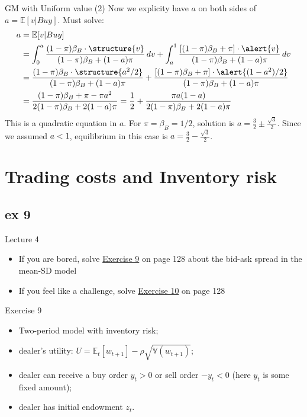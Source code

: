 \documentclass[english,10pt]{beamer}
\begin{document}
\begin{frame}{GM with Uniform value (2)}
	Now we explicity have $a$ on both sides of $a=\mathbb{E}[v|Buy]$. Must solve:
	\begin{align*}
	a 
	& = \mathbb{E}[v|Buy] \\
	& = \int^{a}_0 \frac{(1-\pi) \beta_B \cdot \structure{v}}{(1-\pi)\beta_B + (1-a) \pi} \, dv + \int^{1}_{a} \frac{[(1-\pi) \beta_B + \pi] \cdot \alert{v}}{(1-\pi)\beta_B + (1-a) \pi} \, dv \\
	& =  \frac{(1-\pi) \beta_B \cdot \structure{a^2/2}}{(1-\pi)\beta_B + (1-a) \pi}+  \frac{[(1-\pi) \beta_B + \pi] \cdot \alert{(1-a^2)/2}}{(1-\pi)\beta_B + (1-a) \pi} \\
	& =  \frac{(1-\pi) \beta_B + \pi -\pi a^2}{2(1-\pi)\beta_B + 2(1-a) \pi} = \frac{1}{2} + \frac{\pi a (1 - a)}{2(1-\pi)\beta_B + 2(1-a) \pi}
	\end{align*}
	This is a quadratic equation in $a$. For $\pi=\beta_B=1/2$, solution is $a=\frac{3}{2} \pm \frac{\sqrt{3}}{2}$. Since we assumed $a<1$, equilibrium in this case  is $a=\frac{3}{2} - \frac{\sqrt{3}}{2}$.
\end{frame}




\section{Trading costs and Inventory risk}
\subsection{ex 9}

\begin{frame}{Lecture 4}
	\begin{itemize}
		\item If you are bored, solve \hyperlink{ex9}{Exercise 9} on page 128 about the bid-ask spread in the mean-SD model
		\item If you feel like a challenge, solve \hyperlink{ex10}{Exercise 10} on page 128
	\end{itemize}
\end{frame}


\begin{frame}[label=ex9]{Exercise 9}
	\begin{itemize}
		\item Two-period model with inventory risk;
		\item dealer's utility: $U = \mathbb{E}_t [w_{t+1}] - \rho \sqrt{\mathbb{V}(w_{t+1})}$;
		\item dealer can receive a buy order $y_t > 0$ or sell order $-y_t < 0$ (here $y_t$ is some fixed amount);
		\item dealer has initial endowment $z_t$.
	\end{itemize}
\end{frame}
\end{document}
